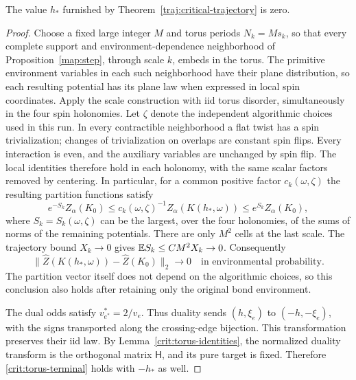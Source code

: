 \begin{proposition}
\label{crit:self-dual-tuning}
The value $h_*$ furnished by
Theorem~\ref{traj:critical-trajectory} is zero.
\end{proposition}

\begin{proof}
Choose a fixed large integer $M$ and torus periods $N_k=Ms_k$, so that
every complete support and environment-dependence neighborhood of
Proposition~\ref{map:step}, through scale $k$, embeds in the torus.
The primitive environment variables in each such neighborhood have
their plane distribution, so each resulting potential has its plane
law when expressed in local spin coordinates. Apply the
scale construction with iid torus disorder, simultaneously in the four
spin holonomies. Let $\zeta$ denote the independent algorithmic choices
used in this run. In every contractible neighborhood a flat twist has a
spin trivialization; changes of trivialization on overlaps are constant
spin flips. Every interaction is even, and the auxiliary variables are
unchanged by spin flip. The local identities therefore hold in each
holonomy, with the same scalar factors removed by centering. In
particular, for a common positive factor $c_k(\omega,\zeta)$ the resulting
partition functions satisfy
\[
 e^{-S_k}Z_\alpha(K_0)
 \le c_k(\omega,\zeta)^{-1}Z_\alpha(K(h_*,\omega))
 \le e^{S_k}Z_\alpha(K_0),
\]
where $S_k=S_k(\omega,\zeta)$ can be the largest, over the four holonomies, of the sums of
norms of the remaining potentials. There are only $M^2$ cells at the
last scale. The trajectory bound $X_k\to0$ gives
$\mathbb E S_k\le C M^2 X_k\to0$. Consequently
\begin{equation}
 \bigl\|\widehat Z(K(h_*,\omega))-
                 \widehat Z(K_0)\bigr\|_2\longrightarrow0
 \quad\text{in environmental probability}.
 \label{crit:torus-terminal}
\end{equation}
The partition vector itself does not depend on the algorithmic choices,
so this conclusion also holds after retaining only the original bond
environment.

The dual odds satisfy $v_{e^*}^*=2/v_e$. Thus duality sends
$(h,\xi_e)$ to $(-h,-\xi_e)$, with the signs transported along the
crossing-edge bijection. This transformation preserves their iid law.
By Lemma~\ref{crit:torus-identities}, the normalized duality transform is
the orthogonal matrix $\mathsf H$, and its pure target is fixed.
Therefore \eqref{crit:torus-terminal} holds with $-h_*$ as well.


\end{proof}
